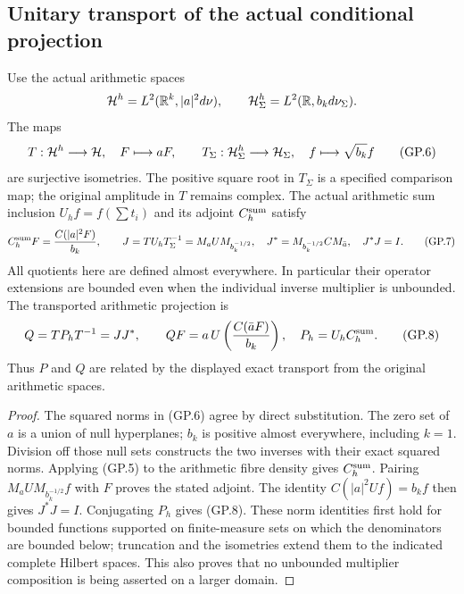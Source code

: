 \subsection{Unitary transport of the actual conditional projection}
\begin{theorem}
Use the actual arithmetic spaces
\[
 \mathcal H^h=L^2(\mathbb R^k,|a|^2d\nu),\qquad
 \mathcal H^h_\Sigma=L^2(\mathbb R,b_kd\nu_\Sigma).
\]
The maps
\begin{equation}
 T:\mathcal H^h\longrightarrow\mathcal H,\quad F\longmapsto aF,
 \qquad T_\Sigma:\mathcal H^h_\Sigma\longrightarrow\mathcal H_\Sigma,
       \quad f\longmapsto\sqrt{b_k}f
 \tag{GP.6}
\end{equation}
are surjective isometries. The positive square root in $T_\Sigma$
is a specified comparison map; the original amplitude in $T$ remains
complex. The actual arithmetic sum inclusion $U_hf=f(\sum t_i)$
and its adjoint $C_h^{\rm sum}$ satisfy
\begin{equation}
 C_h^{\rm sum}F=\frac{C(|a|^2F)}{b_k},\qquad
 J=TU_hT_\Sigma^{-1}=M_aUM_{b_k^{-1/2}},\quad
 J^*=M_{b_k^{-1/2}}CM_{\bar a},\quad J^*J=I.
 \tag{GP.7}
\end{equation}
All quotients here are defined almost everywhere. In particular their
operator extensions are bounded even when the individual inverse
multiplier is unbounded. The transported arithmetic projection is
\begin{equation}
 Q=TP_hT^{-1}=JJ^*,\qquad
 QF=a\,U\left(\frac{C(\bar a F)}{b_k}\right),
 \quad P_h=U_hC_h^{\rm sum}.
 \tag{GP.8}
\end{equation}
Thus $P$ and $Q$ are related by the displayed exact transport from
the original arithmetic spaces.
\end{theorem}
\begin{proof}
The squared norms in (GP.6) agree by direct substitution. The zero set
of $a$ is a union of null hyperplanes; $b_k$ is positive almost
everywhere, including $k=1$. Division off those null sets constructs
the two inverses with their exact squared norms. Applying (GP.5) to
the arithmetic fibre density gives $C_h^{\rm sum}$. Pairing
$M_aUM_{b_k^{-1/2}}f$ with $F$ proves the stated adjoint. The identity
$C(|a|^2Uf)=b_kf$ then gives $J^*J=I$. Conjugating $P_h$ gives
(GP.8). These norm identities first hold for bounded functions
supported on finite-measure sets on which the denominators are
bounded below; truncation and the isometries extend them to the
indicated complete Hilbert spaces. This also proves that no unbounded
multiplier composition is being asserted on a larger domain.
\end{proof}

